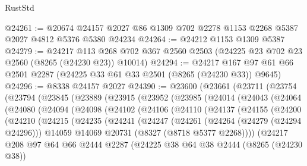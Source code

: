\begin{lexlean}{RustStd}
\begin{coremodule}
@24261 := @20674 @24157 @2027 @86 @1309 @702 @2278 @1153 @2268 @5387 @2027 @4812 @5376 @5380 @24234
@24264 := @24212 @1153 @1309 @5387
@24279 := @24217
    @113
    @268
    @702
    @367
    @2560
    @2503
    (@24225 @23 @702 @23 @2560 (@8265 (@24230 @23)) @10014)
@24294 := @24217 @167 @97 @61 @66 @2501 @2287 (@24225 @33 @61 @33 @2501 (@8265 (@24230 @33)) @9645)
@24296 := @8338 @24157 @2027
@24390 := @23600
    (@23661
      (@23711
        (@23754
          (@23794
            (@23845
              (@23889
                (@23915
                  (@23952
                    (@23985
                      (@24014
                        (@24043
                          (@24064
                            (@24080
                              (@24094
                                (@24098
                                  (@24102
                                    (@24106
                                      (@24110
                                        (@24137
                                          (@24155
                                            (@24200
                                              (@24210
                                                (@24215
                                                  (@24235
                                                    (@24241
                                                      (@24247
                                                        (@24261
                                                          (@24264 (@24279 (@24294 @24296)))
                                                          @14059
                                                          @14069
                                                          @20731
                                                          (@8327 (@8718 @5377 @2268))))
                                                      (@24217
                                                        @208
                                                        @97
                                                        @64
                                                        @66
                                                        @2444
                                                        @2287
                                                        (@24225
                                                          @38
                                                          @64
                                                          @38
                                                          @2444
                                                          (@8265 (@24230 @38))

\end{coremodule}
\end{lexlean}

